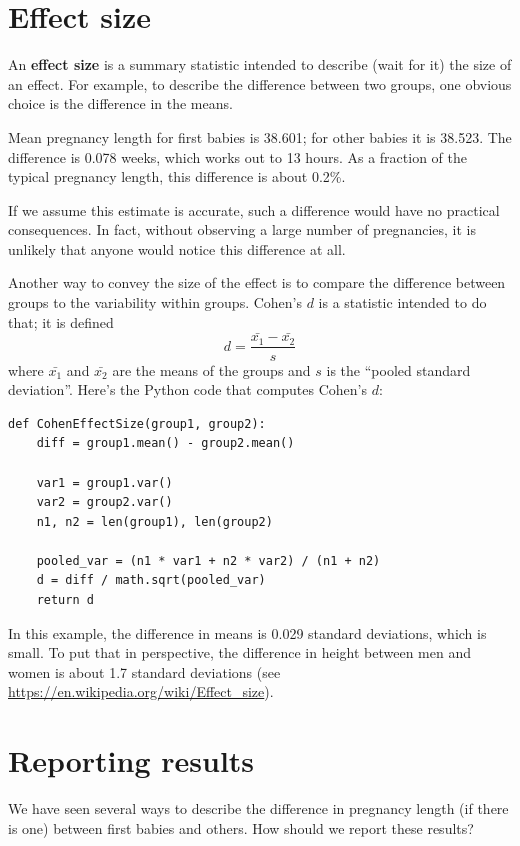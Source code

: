 \documentclass[12pt]{book}
\begin{document}
\section{Effect size}

An {\bf effect size} is a summary statistic intended to describe (wait
for it) the size of an effect.  For example, to describe the
difference between two groups, one obvious choice is the difference in
the means.  

Mean pregnancy length for first babies is 38.601; for
other babies it is 38.523.  The difference is 0.078 weeks, which works
out to 13 hours.  As a fraction of the typical pregnancy length, this
difference is about 0.2\%.

If we assume this estimate is accurate, such a difference
would have no practical consequences.  In fact, without
observing a large number of pregnancies, it is unlikely that anyone
would notice this difference at all.

Another way to convey the size of the effect is to compare the
difference between groups to the variability within groups.
Cohen's $d$ is a statistic intended to do that; it is defined
%
\[ d = \frac{\bar{x_1} - \bar{x_2}}{s}  \]
%
where $\bar{x_1}$ and $\bar{x_2}$ are the means of the groups and
$s$ is the ``pooled standard deviation''.  Here's the Python
code that computes Cohen's $d$:

\begin{verbatim}
def CohenEffectSize(group1, group2):
    diff = group1.mean() - group2.mean()

    var1 = group1.var()
    var2 = group2.var()
    n1, n2 = len(group1), len(group2)

    pooled_var = (n1 * var1 + n2 * var2) / (n1 + n2)
    d = diff / math.sqrt(pooled_var)
    return d
\end{verbatim}

In this example, the difference in means is 0.029 standard deviations,
which is small.  To put that in perspective, the difference in
height between men and women is about 1.7 standard deviations (see
\url{https://en.wikipedia.org/wiki/Effect_size}).


\section{Reporting results}

We have seen several ways to describe the difference in pregnancy
length (if there is one) between first babies and others.  How should
we report these results?
\end{document}
